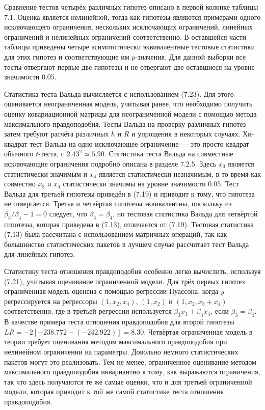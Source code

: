 Сравнение тестов четырёх различных гипотез описано в первой колонке таблицы 7.1. Оценка является нелинейной, тогда как гипотезы являются примерами одного исключающего ограничения, нескольких исключающих ограничений, линейных ограничений и нелинейных ограничений соответственно. В оставшейся части таблицы приведены четыре асимптотически эквивалентные тестовые статистики для этих гипотез и соответствующие им $p$-значения. Для данной выборки все тесты отвергают первые две гипотезы и не отвергают две оставшиеся на уровне значимости 0.05.

Статистика теста Вальда вычисляется с использованием (7.23). Для этого оценивается неограниченная модель, учитывая ранее, что необходимо получить оценку ковариационной матрицы для неограниченной модели с помощью метода максимального правдоподобия. Тесты Вальда на проверку различных гипотез затем требуют расчёта различных $h$ и $R$ и упрощения в некоторых случаях. Хи-квадрат тест Вальда на одно исключающее ограничение --- это просто квадрат обычного $t$-теста, с $2.43^2 \simeq 5.90$. Статистика теста Вальда на совместные исключающие ограничения подробно описана в разделе 7.2.5. Здесь $x_3$ является статистически значимым и $x_4$ является статистически незначимым, в то время как совместно $x_3$ и $x_4$ статистически значимы на уровне значимости 0.05. Тест Вальда для третьей гипотезы приведён в (7.19) и приводит к тому, что гипотеза не отвергается. Третья и четвёртая гипотезы эквивалентны, поскольку из $\beta_3/\beta_4 - 1 = 0$ следует, что $\beta_3 = \beta_4$, но тестовая статистика Вальда для четвёртой гипотезы, которая приведена в (7.13), отличается от (7.19). Тестовая статистика (7.13) была рассчитана с использованием матричных операций, так как большинство статистических пакетов в лучшем случае рассчитает тест Вальда для линейных гипотез.

Статистику теста отношения правдоподобия особенно легко вычислить, используя (7.21), учитывая оценивание ограниченной модели. Для трёх первых гипотез ограниченная модель оценена с помощью регрессии Пуассона, когда $y$ регрессируется на регрессоры $(1, x_2, x_4)$, $(1, x_2)$ и $(1, x_2, x_3 + x_4)$ соответственно, где в третьей регрессии используется $\beta_3 x_3 + \beta_4 x_4$, если $\beta_3 = \beta_4$. В качестве примера теста отношения правдоподобия для второй гипотезы $LR = - 2 [-238.772 - (-242.922)] = 8.30$. Четвёртая ограниченная модель в теории требует оценивания методом максимального правдоподобия при нелинейном ограничении на параметры. Довольно немного статистических пакетов могут это реализовать. Тем не менее, ограниченное оценивание методом максимального правдоподобия инвариантно к тому, как выражаются ограничения, так что здесь получаются те же самые оценки, что и для третьей ограниченной модели, которая приводит к той же самой статистике теста отношения правдоподобия.

